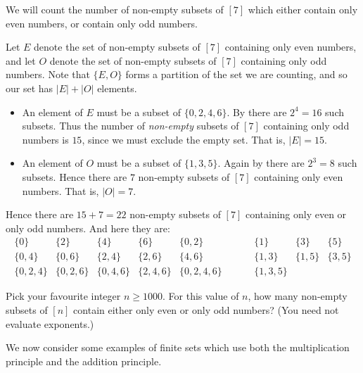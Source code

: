 \begin{example}
We will count the number of non-empty subsets of $[7]$ which either contain only even numbers, or contain only odd numbers.

Let $E$ denote the set of non-empty subsets of $[7]$ containing only even numbers, and let $O$ denote the set of non-empty subsets of $[7]$ containing only odd numbers. Note that $\{ E, O \}$ forms a partition of the set we are counting, and so our set has $|E|+|O|$ elements.
\begin{itemize}
\item An element of $E$ must be a subset of $\{0,2,4,6\}$. By  there are $2^4=16$ such subsets. Thus the number of \textit{non-empty} subsets of $[7]$ containing only odd numbers is $15$, since we must exclude the empty set. That is, $|E|=15$.
\item An element of $O$ must be a subset of $\{1,3,5\}$. Again by  there are $2^3=8$ such subsets. Hence there are $7$ non-empty subsets of $[7]$ containing only even numbers. That is, $|O|=7$.
\end{itemize}
Hence there are $15+7=22$ non-empty subsets of $[7]$ containing only even or only odd numbers. And here they are:
\[ \begin{matrix}
\{ 0 \} & \{ 2 \} & \{ 4 \} & \{ 6 \} & \{ 0, 2 \} & \hspace{20pt} & \{ 1 \} & \{ 3 \} & \{ 5 \} \\
\{ 0, 4 \} & \{ 0, 6 \} & \{ 2, 4 \} & \{ 2, 6 \} & \{ 4, 6 \} && \{ 1, 3 \} & \{ 1, 5 \} & \{ 3, 5 \} \\
\{ 0, 2, 4 \} & \{ 0, 2, 6 \} & \{ 0, 4, 6 \} & \{ 2, 4, 6 \} & \{ 0, 2, 4, 6\} && \{ 1, 3, 5 \} && 
\end{matrix} \]
\end{example}

\begin{exercise}
Pick your favourite integer $n \ge 1000$. For this value of $n$, how many non-empty subsets of $[n]$ contain either only even or only odd numbers? (You need not evaluate exponents.)
\end{exercise}

We now consider some examples of finite sets which use both the multiplication principle and the addition principle.


